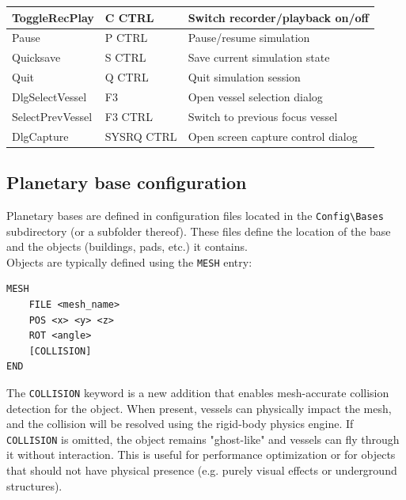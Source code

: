 \documentclass[Orbiter User Manual.tex]{subfiles}
\begin{document}
\begin{longtable}{ p{} p{} p{} }
	\hline
	ToggleRecPlay & C CTRL & Switch recorder/playback on/off\\
	\hline
	Pause & P CTRL & Pause/resume simulation\\
	\hline
	Quicksave & S CTRL & Save current simulation state\\
	\hline
	Quit & Q CTRL & Quit simulation session\\
	\hline
	DlgSelectVessel & F3 & Open vessel selection dialog\\
	\hline
	SelectPrevVessel & F3 CTRL & Switch to previous focus vessel\\
	\hline
	DlgCapture & SYSRQ CTRL & Open screen capture control dialog\\
	\hline
	\end{longtable}
	\normalsize


\subsection{Planetary base configuration}
Planetary bases are defined in configuration files located in the \texttt{Config\textbackslash Bases} subdirectory (or a subfolder thereof). These files define the location of the base and the objects (buildings, pads, etc.) it contains.\\
Objects are typically defined using the \texttt{MESH} entry:

\begin{lstlisting}[language=OSFS]
MESH
	FILE <mesh_name>
	POS <x> <y> <z>
	ROT <angle>
	[COLLISION]
END
\end{lstlisting}

\noindent
The \texttt{COLLISION} keyword is a new addition that enables mesh-accurate collision detection for the object. When present, vessels can physically impact the mesh, and the collision will be resolved using the rigid-body physics engine. If \texttt{COLLISION} is omitted, the object remains "ghost-like" and vessels can fly through it without interaction. This is useful for performance optimization or for objects that should not have physical presence (e.g. purely visual effects or underground structures).
\end{document}
